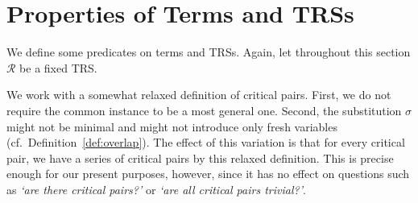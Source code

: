 \section{Properties of Terms and TRSs}

We define some predicates on terms and TRSs. Again, let throughout
this section $\mathcal{R}$ be a fixed TRS.

We work with a somewhat relaxed definition of critical pairs. First,
we do not require the common instance to be a most general
one. Second, the substitution $\sigma$ might not be minimal and might
not introduce only fresh variables
(cf.\ Definition~\ref{def:overlap}). The effect of this variation is
that for every critical pair, we have a series of critical pairs by
this relaxed definition. This is precise enough for our present
purposes, however, since it has no effect on questions such as
\emph{`are there critical pairs?'} or \emph{`are all critical pairs
  trivial?'}.
